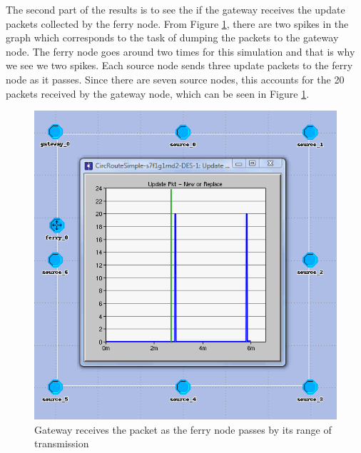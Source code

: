 The second part of the results is to see the if the gateway receives the update packets collected by the ferry node.  From Figure \ref{fig:result1-b}, there are two spikes in the graph which corresponds to the task of dumping the packets to the gateway node.  
The ferry node goes around two times for this simulation and that is why we see we two spikes.  
Each source node sends three update packets to the ferry node as it passes.  
Since there are seven source nodes, this accounts for the 20 packets received by the gateway node, which can be seen in Figure \ref{fig:result1-b}.


\begin{figure}[ht]
    \centering
    \includegraphics[width=.5\textwidth]{images/scenario1-result-gateway}
    \caption{Gateway receives the packet as the ferry node passes by its range of transmission}
    \label{fig:result1-b}
\end{figure}

